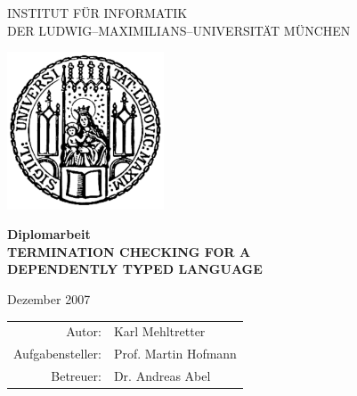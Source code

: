 \documentclass[a4paper,11pt]{report}
\theoremstyle{remark}
\begin{document}
\begin{titlepage}

\begin{center}

{\Huge INSTITUT F\"UR INFORMATIK\\[1mm]} %
DER LUDWIG--MAXIMILIANS--UNIVERSIT\"AT M\"UNCHEN\\

\vspace*{1cm}

\includegraphics[width=0.35\textwidth]{siegel.pdf}

\vspace*{2cm}

{\LARGE \textbf{Diplomarbeit}}\\

\vspace{2.0cm}
{\LARGE \textbf{TERMINATION CHECKING FOR A}}\\
\vspace*{3mm}
{\LARGE \textbf{DEPENDENTLY TYPED LANGUAGE}}\\

\vspace{2cm}

\Large{Dezember 2007}

\vspace{1.5cm}

  \begin{Large}
  \begin{tabular}{rl}
      Autor: &Karl Mehltretter\\
      Aufgabensteller: & Prof. Martin Hofmann\\
      Betreuer: & Dr. Andreas Abel\\
  \end{tabular}
  \end{Large}

\end{center}

\end{titlepage}


\end{document}
